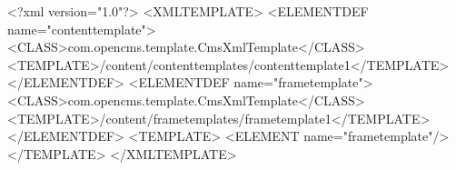 <?xml version="1.0"?> <XMLTEMPLATE>
    <ELEMENTDEF name="contenttemplate">
        <CLASS>com.opencms.template.CmsXmlTemplate</CLASS>
        <TEMPLATE>/content/contenttemplates/contenttemplate1</TEMPLATE>
    </ELEMENTDEF>
    <ELEMENTDEF name="frametemplate">
        <CLASS>com.opencms.template.CmsXmlTemplate</CLASS>
        <TEMPLATE>/content/frametemplates/frametemplate1</TEMPLATE>
    </ELEMENTDEF>
<TEMPLATE> <ELEMENT name="frametemplate"/> </TEMPLATE>
</XMLTEMPLATE>
